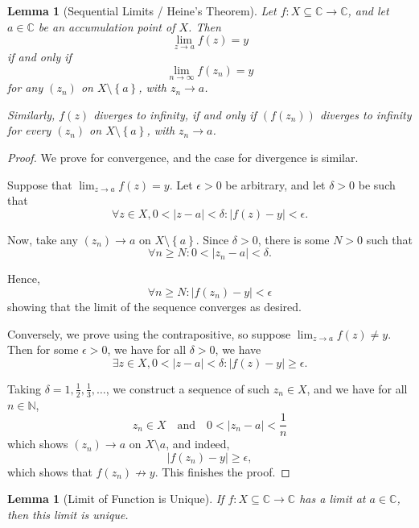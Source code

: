 \documentclass[11pt]{article}
\numberwithin{equation}{section}
\newtheorem{lemma}[theorem]{Lemma}
\theoremstyle{definition}
\theoremstyle{remark}
\newcommand{\pqty}[1]{\left(#1\right)}
\newcommand{\Bqty}[1]{\left\{#1\right\}}
\newcommand{\abs}[1]{\left|#1\right|}
\newcommand{\functiondomain}[3]{#1:#2\to #3}
\newcommand{\CC}{\mathbb C}
\newcommand{\NN}{\mathbb N}
\newcommand{\qand}{\quad\text{and}\quad}
\newcommand{\notto}{\not\to}
\begin{document}
\begin{lemma}[Sequential Limits / Heine's Theorem]\label{analysis-unit-0075}
    \label{lem:fn-sequential-limits}%
    Let \(\functiondomain{f}{X \subseteq \CC}{\CC}\), and let \(a \in \CC\) be an accumulation point of \(X\). Then
    \[
        \lim_{z \to a} f\pqty{z} = y
    \]
    if and only if
    \[
        \lim_{n \to \infty} f\pqty{z_n} = y
    \]
    for any \(\pqty{z_n}\) on \(X \setminus \Bqty{a}\), with \(z_n \to a\).

    Similarly, \(f\pqty{z}\) diverges to infinity, if and only if \(\pqty{f\pqty{z_n}}\) diverges to infinity for every \(\pqty{z_n}\) on \(X \setminus \Bqty{a}\), with \(z_n \to a\).
\end{lemma}

\begin{proof}
    We prove for convergence, and the case for divergence is similar.
    
    Suppose that \(\lim_{z \to a} f\pqty{z} = y\). Let \(\epsilon > 0\) be arbitrary, and let \(\delta > 0\) be such that
    \[
        \forall z \in X, 0 < \abs{z - a} < \delta: \abs{f\pqty{z} - y} < \epsilon.
    \]

    Now, take any \(\pqty{z_n} \to a\) on \(X \setminus \Bqty{a}\). Since \(\delta > 0\), there is some \(N > 0\) such that
    \[
        \forall n \geq N: 0 < \abs{z_n - a} < \delta.
    \]

    Hence,
    \[
        \forall n \geq N: \abs{f\pqty{z_n} - y} < \epsilon
    \]
    showing that the limit of the sequence converges as desired.

    Conversely, we prove using the contrapositive, so suppose \(\lim_{z \to a} f\pqty{z} \neq y\). Then for some \(\epsilon > 0\), we have for all \(\delta > 0\), we have
    \[
        \exists z \in X, 0 < \abs{z - a} < \delta: \abs{f\pqty{z} - y} \geq \epsilon.
    \]

    Taking \(\delta = 1, \frac{1}{2}, \frac{1}{3}, \ldots\), we construct a sequence of such \(z_n \in X\), and we have for all \(n \in \NN\),
    \[
        z_n \in X \qand 0 < \abs{z_n - a} < \frac{1}{n}
    \]
    which shows \(\pqty{z_n} \to a\) on \(X \setminus a\), and indeed,
    \[
        \abs{f\pqty{z_n} - y} \geq \epsilon,
    \]
    which shows that \(f\pqty{z_n} \notto y\). This finishes the proof.
\end{proof}

\begin{lemma}[Limit of Function is Unique]\label{analysis-unit-0076}
    \label{lem:fn-limit-unique}%
    If \(\functiondomain{f}{X \subseteq \CC}{\CC}\) has a limit at \(a \in \CC\), then this limit is unique.
\end{lemma}
\end{document}
